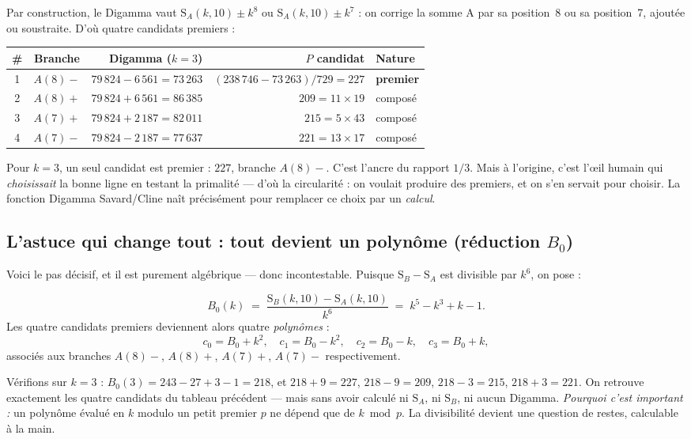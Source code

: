 \documentclass[11pt,a4paper]{article}
\newcommand{\SA}{\mathrm{S}_A}
\newcommand{\SB}{\mathrm{S}_B}
\begin{document}
Par construction, le Digamma vaut $\SA(k,10) \pm k^8$ ou
$\SA(k,10) \pm k^7$ : on corrige la somme A par sa position~8 ou sa
position~7, ajoutée ou soustraite. D'où quatre candidats premiers :
\begin{center}\small
\begin{tabular}{@{}c c r r l@{}}
\toprule
\rowcolor{spectralgris}
\# & Branche & Digamma ($k=3$) & $P$ candidat & Nature \\
\midrule
1 & $A(8)-$ & $79\,824 - 6\,561 = 73\,263$ & $(238\,746-73\,263)/729 = 227$ & \textbf{premier} \\
2 & $A(8)+$ & $79\,824 + 6\,561 = 86\,385$ & $209 = 11 \times 19$ & composé \\
3 & $A(7)+$ & $79\,824 + 2\,187 = 82\,011$ & $215 = 5 \times 43$ & composé \\
4 & $A(7)-$ & $79\,824 - 2\,187 = 77\,637$ & $221 = 13 \times 17$ & composé \\
\bottomrule
\end{tabular}
\end{center}
Pour $k = 3$, un seul candidat est premier : $227$, branche $A(8)-$. C'est
l'ancre du rapport $1/3$. Mais à l'origine, c'est l'œil humain qui
\emph{choisissait} la bonne ligne en testant la primalité --- d'où la
circularité : on voulait produire des premiers, et on s'en servait pour
choisir. La fonction Digamma Savard/Cline naît précisément pour
remplacer ce choix par un \emph{calcul}.

\subsection{L'astuce qui change tout : tout devient un polynôme (réduction \texorpdfstring{$B_0$}{B_0})}
Voici le pas décisif, et il est purement algébrique --- donc incontestable.
Puisque $\SB - \SA$ est divisible par $k^6$, on pose :
\vspace{0.3cm}
\begin{boiteformule}
\[
B_0(k) \;=\; \frac{\SB(k,10)-\SA(k,10)}{k^{6}} \;=\; k^{5}-k^{3}+k-1.
\]
Les quatre candidats premiers deviennent alors quatre \emph{polynômes} :
\[
c_0 = B_0+k^{2},\quad c_1 = B_0-k^{2},\quad c_2 = B_0-k,\quad c_3 = B_0+k,
\]
associés aux branches $A(8)-$, $A(8)+$, $A(7)+$, $A(7)-$ respectivement.
\end{boiteformule}
Vérifions sur $k = 3$ : $B_0(3) = 243 - 27 + 3 - 1 = 218$, et
$218+9 = 227$, $218-9 = 209$, $218-3 = 215$, $218+3 = 221$.
On retrouve exactement les quatre candidats du tableau précédent ---
mais sans avoir calculé ni $\SA$, ni $\SB$, ni aucun Digamma.
\emph{Pourquoi c'est important :} un polynôme évalué en $k$ modulo un
petit premier $p$ ne dépend que de $k \bmod p$. La divisibilité devient
une question de restes, calculable à la main.
\end{document}
